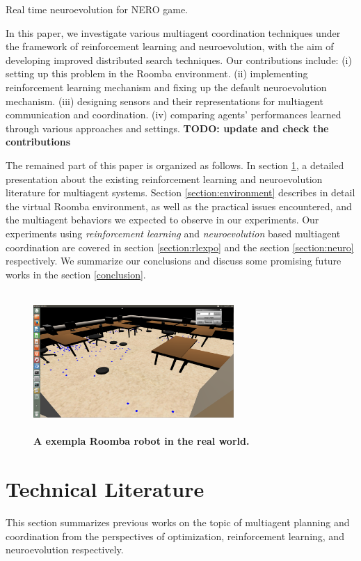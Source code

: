 \documentclass[conference]{IEEEtran}
\begin{document}
\cite{stanley2005real} Real time neuroevolution for NERO game. 

In this paper, we
investigate various multiagent coordination techniques under the framework of
reinforcement learning and neuroevolution, with the aim of developing improved distributed search techniques. 
Our contributions include: 
(i) setting up this problem in the Roomba environment. 
(ii) implementing reinforcement learning mechanism and fixing up the default
neuroevolution mechanism. 
(iii) designing sensors and their representations for multiagent
communication and coordination. 
(iv) comparing agents' performances learned through various approaches and
settings.
\textbf{TODO: update and check the contributions}

The remained part of this paper is organized as follows. 
In section \ref{section:literature}, a detailed presentation about the
existing reinforcement learning and neuroevolution literature
for multiagent systems.  
Section \ref{section:environment} describes in detail the virtual Roomba
environment, as well as the practical issues encountered, and the multiagent
behaviors we expected to observe in our experiments.  
Our experiments using 
\textit{reinforcement learning} and \textit{neuroevolution} based
multiagent coordination are covered in section \ref{section:rlexpo}
and the section \ref{section:neuro} respectively.  
We summarize our conclusions and discuss some promising future works in the
section \ref{conclusion}. 


\begin{figure}[!t]
\centering
\includegraphics[width=3in,height=2.1in]{./figures/roombas/roomba3.png}
\caption{\textbf{A exempla Roomba robot in the real world.}}
\label{roomba:world}
\end{figure}

\section{Technical Literature} \label{section:literature}
This section summarizes previous works on the topic of multiagent planning and
coordination from the perspectives of optimization, reinforcement learning,
and neuroevolution respectively.
\end{document}
